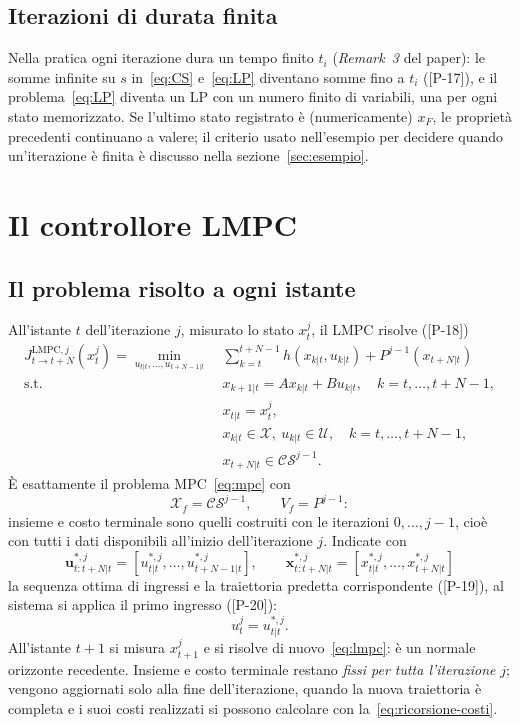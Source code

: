 \documentclass[11pt,a4paper]{article}
\theoremstyle{definition}
\theoremstyle{plain}
\theoremstyle{remark}
\newcommand{\Xc}{\mathcal{X}}
\newcommand{\Uc}{\mathcal{U}}
\newcommand{\Xf}{\mathcal{X}_f}
\newcommand{\CS}{\mathcal{CS}}
\newcommand{\JLt}{J^{\mathrm{LMPC},j}_{t\to t+N}}
\newcommand{\eqp}[1]{\textup{[P-#1]}}   %
\newcommand{\vett}[1]{\mathbf{#1}}
\begin{document}
\subsection{Iterazioni di durata finita}

Nella pratica ogni iterazione dura un tempo finito $t_i$ (\emph{Remark~3} del
paper): le somme infinite su $s$ in~\eqref{eq:CS} e~\eqref{eq:LP} diventano
somme fino a $t_i$ (\eqp{17}), e il problema~\eqref{eq:LP} diventa un LP con un
numero finito di variabili, una per ogni stato memorizzato. Se l'ultimo
stato registrato è (numericamente) $x_F$, le proprietà precedenti continuano
a valere; il criterio usato nell'esempio per decidere quando un'iterazione è
finita è discusso nella sezione~\ref{sec:esempio}.

\section{Il controllore LMPC}\label{sec:lmpc}

\subsection{Il problema risolto a ogni istante}

All'istante $t$ dell'iterazione $j$, misurato lo stato $x^j_t$, il LMPC
risolve (\eqp{18})
\begin{equation}\label{eq:lmpc}
\begin{aligned}
  \JLt(x^j_t) = \min_{u_{t|t},\dots,u_{t+N-1|t}}\ &
  \sum_{k=t}^{t+N-1} h(x_{k|t},u_{k|t}) + P^{j-1}(x_{t+N|t})\\
  \text{s.t. }\ & x_{k+1|t} = Ax_{k|t}+Bu_{k|t},\quad k=t,\dots,t+N-1,\\
  & x_{t|t} = x^j_t,\\
  & x_{k|t}\in\Xc,\ u_{k|t}\in\Uc,\quad k=t,\dots,t+N-1,\\
  & x_{t+N|t}\in\CS^{j-1}.
\end{aligned}
\end{equation}
È esattamente il problema MPC~\eqref{eq:mpc} con
\[
  \Xf=\CS^{j-1},\qquad V_f = P^{j-1}:
\]
insieme e costo terminale sono quelli costruiti con le iterazioni
$0,\dots,j-1$, cioè con tutti i dati disponibili all'inizio dell'iterazione
$j$. Indicate con
\[
  \vett{u}^{*,j}_{t:t+N|t}=[u^{*,j}_{t|t},\dots,u^{*,j}_{t+N-1|t}],\qquad
  \vett{x}^{*,j}_{t:t+N|t}=[x^{*,j}_{t|t},\dots,x^{*,j}_{t+N|t}]
\]
la sequenza ottima di ingressi e la traiettoria predetta corrispondente
(\eqp{19}), al sistema si applica il primo ingresso (\eqp{20}):
\begin{equation}\label{eq:legge}
  u^j_t = u^{*,j}_{t|t}.
\end{equation}
All'istante $t+1$ si misura $x^j_{t+1}$ e si risolve di nuovo~\eqref{eq:lmpc}:
è un normale orizzonte recedente. Insieme e costo terminale restano
\emph{fissi per tutta l'iterazione} $j$; vengono aggiornati solo alla fine
dell'iterazione, quando la nuova traiettoria è completa e i suoi costi
realizzati si possono calcolare con la~\eqref{eq:ricorsione-costi}.
\end{document}
